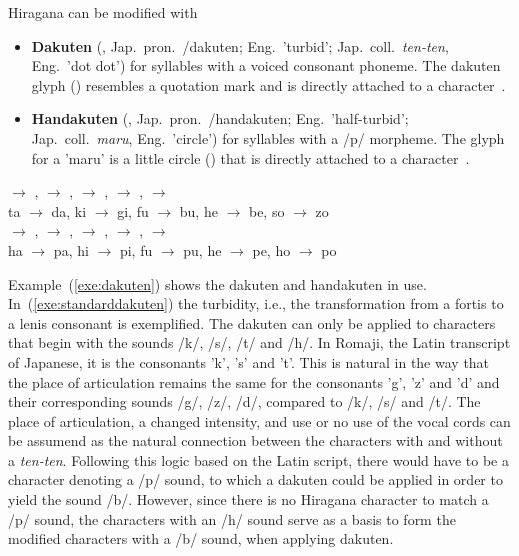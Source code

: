 Hiragana can be modified with
\begin{itemize}

  \item \textbf{Dakuten} (, Jap.~pron.~/dakuten;
        Eng.~'turbid'; Jap.~coll.~\emph{ten-ten}, Eng.~'dot dot') for 
        syllables with a voiced consonant phoneme. The dakuten glyph ()  
        resembles a quotation mark and is directly attached to a 
        character~.

  \item \textbf{Handakuten} (,
        Jap.~pron.~/handakuten; 
        Eng.~'half-turbid'; Jap.~coll.~\emph{maru}, Eng.~'circle') for syllables 
        with a /p/ morpheme. The glyph for a 'maru' is a little circle ()
        that is directly attached to a character~.

\end{itemize}
\begin{exe}
\ex \label{exe:dakuten}
\begin{xlist}
\ex \label{exe:standarddakuten}
\gll {} $\rightarrow$ ,  $\rightarrow$ ,  $\rightarrow$ ,  $\rightarrow$ ,  $\rightarrow$  \\
ta $\rightarrow$ da, ki $\rightarrow$ gi, fu $\rightarrow$ bu, he $\rightarrow$ be, so $\rightarrow$ zo \\

\ex \label{exe:handakuten}
\gll {} $\rightarrow$ ,  $\rightarrow$ ,  $\rightarrow$ ,  $\rightarrow$ ,  $\rightarrow$  \\
ha $\rightarrow$ pa, hi $\rightarrow$ pi, fu $\rightarrow$ pu, he $\rightarrow$ pe, ho $\rightarrow$ po \\
\end{xlist}
\end{exe}
Example~(\ref{exe:dakuten}) shows the dakuten and handakuten in use. 
In~(\ref{exe:standarddakuten}) the turbidity, i.e., the transformation from a 
fortis to a lenis consonant is exemplified. 
The dakuten can only be applied to characters that begin with the sounds 
/k/, /s/, /t/ and /h/. In Romaji, the Latin transcript of Japanese, it is
the consonants 'k', 's' and 't'. This is natural in the
way that the place of articulation remains the same for the consonants 'g', 'z' 
and 'd' and their corresponding sounds /g/, /z/, /d/, 
compared to /k/, /s/ and /t/.
The place of articulation, a changed intensity, and use or no use of the vocal 
cords can be assumend as the natural connection between the characters with and 
without a \emph{ten-ten}. 
Following this logic based on the Latin script, 
there would have to be a character denoting a /p/ sound,
to which a dakuten could be applied in order to yield the sound /b/.
However, since there is no Hiragana character to match a /p/ sound,
the characters with an /h/ sound serve as a basis to form the modified 
characters with a /b/ sound, when applying dakuten.

